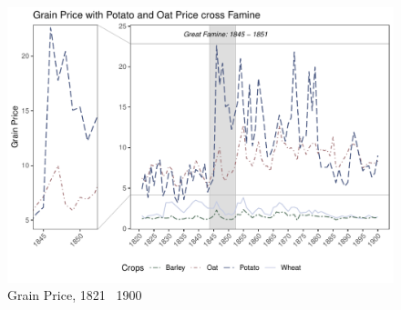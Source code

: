 \begin{figure}[htbp]
    \centering
    \caption{Grain Price, 1821 \textendash\ 1900}
    \includegraphics[width=.95\textwidth]{../03_outputs/grain_price.pdf}
\end{figure}


